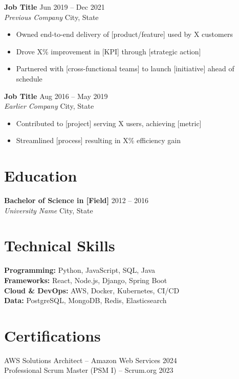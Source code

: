 \documentclass[11pt,a4paper]{article}
\newcommand{\entry}[4]{%
    \noindent\textbf{\color{darktext}#1} \hfill {\small #2} \\
    \textit{#3} \hfill {\small #4}%
}
\begin{document}
\entry{Job Title}{Jun 2019 -- Dec 2021}{Previous Company}{City, State}
\begin{itemize}[leftmargin=1.5em, itemsep=0.2em, topsep=0.3em]
    \item Owned end-to-end delivery of [product/feature] used by X customers
    \item Drove X\% improvement in [KPI] through [strategic action]
    \item Partnered with [cross-functional teams] to launch [initiative] ahead of schedule
\end{itemize}

\vspace{0.5em}

\entry{Job Title}{Aug 2016 -- May 2019}{Earlier Company}{City, State}
\begin{itemize}[leftmargin=1.5em, itemsep=0.2em, topsep=0.3em]
    \item Contributed to [project] serving X users, achieving [metric]
    \item Streamlined [process] resulting in X\% efficiency gain
\end{itemize}

\section{Education}

\entry{Bachelor of Science in [Field]}{2012 -- 2016}{University Name}{City, State}

\section{Technical Skills}

\textbf{Programming:} Python, JavaScript, SQL, Java \\
\textbf{Frameworks:} React, Node.js, Django, Spring Boot \\
\textbf{Cloud \& DevOps:} AWS, Docker, Kubernetes, CI/CD \\
\textbf{Data:} PostgreSQL, MongoDB, Redis, Elasticsearch

\section{Certifications}

\noindent AWS Solutions Architect -- Amazon Web Services \hfill 2024 \\
Professional Scrum Master (PSM I) -- Scrum.org \hfill 2023
\end{document}
